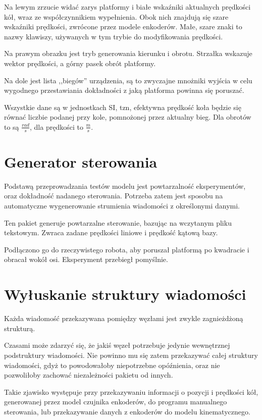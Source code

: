 	Na lewym zrzucie widać zarys platformy i białe wskaźniki aktualnych prędkości kół, wraz ze współczynnikiem wypełnienia.
	Obok nich znajdują się szare wskaźniki prędkości, zwrócone przez modele enkoderów.
	Małe, szare znaki to nazwy klawiszy, używanych w tym trybie do modyfikowania prędkości.
	
	Na prawym obrazku jest tryb generowania kierunku i obrotu. Strzałka wskazuje wektor prędkości, a górny pasek obrót platformy.
	
	Na dole jest lista ,,biegów'' urządzenia, są to zwyczajne mnożniki wyjścia w celu wygodnego przestawiania dokładności z jaką platforma powinna się poruszać.
	
	Wszystkie dane są w jednostkach SI, tzn, efektywna prędkość koła będzie się równać liczbie podanej przy kole, pomnożonej przez aktualny bieg.
	Dla obrotów to są $\frac{rad}{s}$, dla prędkości to $\frac{m}{s}$.
	
\section{Generator sterowania}
	\label{sec:gramofon}
	Podstawą przeprowadzania testów modelu jest powtarzalność eksperymentów, oraz dokładność nadanego sterowania.
	Potrzeba zatem jest sposobu na automatyczne wygenerowanie strumienia wiadomości z określonymi danymi.
	
	Ten pakiet generuje powtarzalne sterowanie, bazując na wczytanym pliku tekstowym.
	Zwraca zadane prędkości liniowe i prędkość kątową bazy.
	
	Podłączono go do rzeczywistego robota, aby poruszał platformą po kwadracie i obracał wokół osi.
	Eksperyment przebiegł pomyślnie.
		
\section{Wyłuskanie struktury wiadomości}
	\label{sec:dziadzio}
	Każda wiadomość przekazywana pomiędzy węzłami jest zwykle zagnieżdżoną strukturą.
	
	Czasami może zdarzyć się, że jakiś węzeł potrzebuje jedynie wewnętrznej podstruktury wiadomości.
	Nie powinno mu się zatem przekazywać całej struktury wiadomości, gdyż to powodowałoby niepotrzebne opóźnienia, oraz nie pozwoliłoby zachować niezależności 
	pakietu od innych.
	
	Takie zjawisko występuje przy przekazywaniu informacji o pozycji i prędkości kół, generowanej przez model czujnika enkoderów, do programu
	manualnego sterowania, lub przekazywanie danych z enkoderów do modelu kinematycznego.
	
